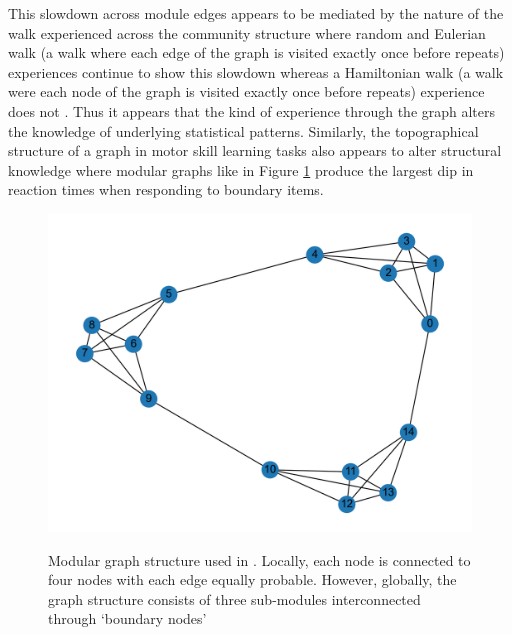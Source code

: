 This slowdown across module edges appears to be mediated by the nature of the walk experienced across the community structure where random and Eulerian walk (a walk where each edge of the graph is visited exactly once before repeats) experiences continue to show this slowdown whereas a Hamiltonian walk (a walk were each node of the graph is visited exactly once before repeats) experience does not \parencite{karuza2017process}. Thus it appears that the kind of experience through the graph alters the knowledge of underlying statistical patterns. Similarly, the topographical structure of a graph in motor skill learning tasks also appears to alter structural knowledge \parencite{lynn2020abstract, lynn2020human, lynn2020humans} where modular graphs like in Figure \ref{fig:modular_graph} produce the largest dip in reaction times when responding to boundary items. 


\begin{figure}[ht]
	\centering
	\caption{Modular graph structure used in \cite{schapiro2013neural}. Locally, each node is connected to four nodes with each edge equally probable. However, globally, the graph structure consists of three sub-modules interconnected through `boundary nodes'}
	\includegraphics[width = \textwidth]{chapter_notebooks/chapter_2/figures/modular_graph.png}
	\label{fig:modular_graph}
\end{figure}


